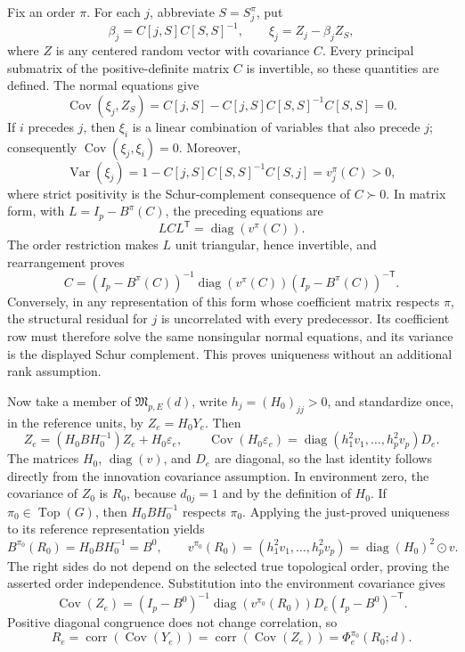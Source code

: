Fix an order \(\pi\).  For each \(j\), abbreviate \(S=S_j^\pi\), put
\[
 \beta_j=C[j,S]C[S,S]^{-1},\qquad
 \xi_j=Z_j-\beta_j Z_S,
\]
where \(Z\) is any centered random vector with covariance \(C\).  Every principal submatrix of the positive-definite matrix \(C\) is invertible, so these quantities are defined.  The normal equations give
\[
 \operatorname{Cov}(\xi_j,Z_S)
 =C[j,S]-C[j,S]C[S,S]^{-1}C[S,S]=0.
\]
If \(i\) precedes \(j\), then \(\xi_i\) is a linear combination of variables that also precede \(j\); consequently \(\operatorname{Cov}(\xi_j,\xi_i)=0\).  Moreover,
\[
 \operatorname{Var}(\xi_j)
 =1-C[j,S]C[S,S]^{-1}C[S,j]=v_j^\pi(C)>0,
\]
where strict positivity is the Schur-complement consequence of \(C\succ0\).  In matrix form, with \(L=I_p-B^\pi(C)\), the preceding equations are
\[
 LCL^{\mathsf T}=\operatorname{diag}(v^\pi(C)).
\]
The order restriction makes \(L\) unit triangular, hence invertible, and rearrangement proves
\[
 C=(I_p-B^\pi(C))^{-1}\operatorname{diag}(v^\pi(C))(I_p-B^\pi(C))^{-\mathsf T}.
\]
Conversely, in any representation of this form whose coefficient matrix respects \(\pi\), the structural residual for \(j\) is uncorrelated with every predecessor.  Its coefficient row must therefore solve the same nonsingular normal equations, and its variance is the displayed Schur complement.  This proves uniqueness without an additional rank assumption.

Now take a member of \(\mathfrak M_{p,E}(d)\), write \(h_j=(H_0)_{jj}>0\), and standardize once, in the reference units, by \(Z_e=H_0Y_e\).  Then
\[
 Z_e=(H_0BH_0^{-1})Z_e+H_0\varepsilon_e,
 \qquad
 \operatorname{Cov}(H_0\varepsilon_e)
 =\operatorname{diag}(h_1^2v_1,\ldots,h_p^2v_p)D_e.
\]
The matrices \(H_0\), \(\operatorname{diag}(v)\), and \(D_e\) are diagonal, so the last identity follows directly from the innovation covariance assumption.  In environment zero, the covariance of \(Z_0\) is \(R_0\), because \(d_{0j}=1\) and by the definition of \(H_0\).  If \(\pi_0\in\operatorname{Top}(G)\), then \(H_0BH_0^{-1}\) respects \(\pi_0\).  Applying the just-proved uniqueness to its reference representation yields
\[
 B^{\pi_0}(R_0)=H_0BH_0^{-1}=B^0,
 \qquad
 v^{\pi_0}(R_0)=(h_1^2v_1,\ldots,h_p^2v_p)
 =\operatorname{diag}(H_0)^2\odot v.
\]
The right sides do not depend on the selected true topological order, proving the asserted order independence.  Substitution into the environment covariance gives
\[
 \operatorname{Cov}(Z_e)
 =(I_p-B^0)^{-1}\operatorname{diag}(v^{\pi_0}(R_0))D_e
 (I_p-B^0)^{-\mathsf T}.
\]
Positive diagonal congruence does not change correlation, so
\[
 R_e=\operatorname{corr}(\operatorname{Cov}(Y_e))
 =\operatorname{corr}(\operatorname{Cov}(Z_e))
 =\Phi_e^{\pi_0}(R_0;d).
\]

